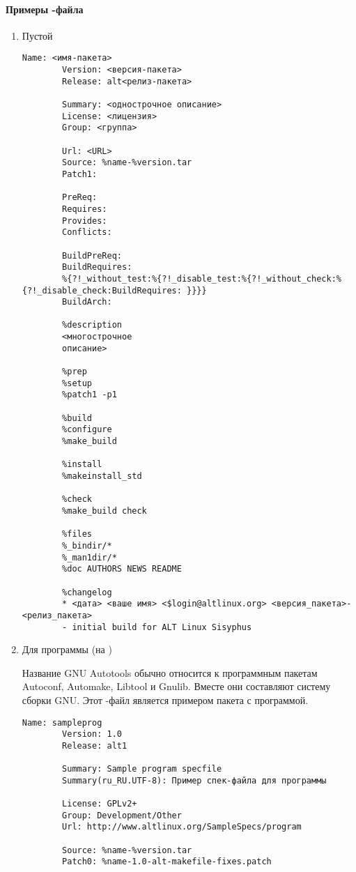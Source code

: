 \paragraph{Примеры -файла}
\begin{enumerate}
	\item Пустой 
	\begin{Verbatim}[breaklines=true,breakanywhere=true,xleftmargin=-2.95cm]
		Name: <имя-пакета>
		Version: <версия-пакета>
		Release: alt<релиз-пакета>
		
		Summary: <однострочное описание>
		License: <лицензия>
		Group: <группа>
		
		Url: <URL>
		Source: %name-%version.tar
		Patch1:
		
		PreReq:
		Requires:
		Provides:
		Conflicts:
		
		BuildPreReq:
		BuildRequires:
		%{?!_without_test:%{?!_disable_test:%{?!_without_check:%{?!_disable_check:BuildRequires: }}}}
		BuildArch:
		
		%description
		<многострочное
		описание>
		
		%prep
		%setup
		%patch1 -p1
		
		%build
		%configure
		%make_build
		
		%install
		%makeinstall_std
		
		%check
		%make_build check
		
		%files
		%_bindir/*
		%_man1dir/*
		%doc AUTHORS NEWS README
		
		%changelog
		* <дата> <ваше имя> <$login@altlinux.org> <версия_пакета>-<релиз_пакета>
		- initial build for ALT Linux Sisyphus
	\end{Verbatim}
	
	\item Для программы (на )
	
	Название GNU Autotools обычно относится к программным пакетам Autoconf, Automake, Libtool и Gnulib. Вместе они составляют систему сборки GNU. Этот -файл является примером пакета с программой.
	\begin{Verbatim}[breaklines=true,breakanywhere=true,xleftmargin=-2.95cm]
		Name: sampleprog
		Version: 1.0
		Release: alt1
		
		Summary: Sample program specfile
		Summary(ru_RU.UTF-8): Пример спек-файла для программы
		
		License: GPLv2+
		Group: Development/Other
		Url: http://www.altlinux.org/SampleSpecs/program
		
		Source: %name-%version.tar
		Patch0: %name-1.0-alt-makefile-fixes.patch
		

\end{Verbatim}
\end{enumerate}

